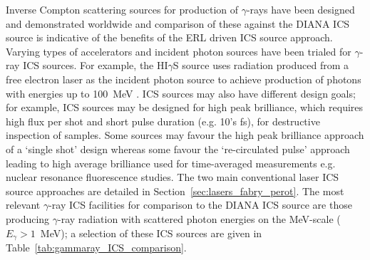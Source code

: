\documentclass[../main.tex]{subfiles}
\begin{document}
Inverse Compton scattering sources for production of $\gamma$-rays have been designed and demonstrated worldwide and comparison of these against the DIANA ICS source is indicative of the benefits of the ERL driven ICS source approach. Varying types of accelerators and incident photon sources have been trialed for $\gamma$-ray ICS sources. For example, the HI$\gamma$S source uses radiation produced from a free electron laser as the incident photon source to achieve production of photons with energies up to 100~\si{\mega\electronvolt} \cite{weller2009research}. ICS sources may also have different design goals; for example, ICS sources may be designed for high peak brilliance, which requires high flux per shot and short pulse duration (e.g. 10's \si{\femto\second}), for destructive inspection of samples. Some sources may favour the high peak brilliance approach of a `single shot' design whereas some favour the `re-circulated pulse' approach leading to high average brilliance used for time-averaged measurements e.g. nuclear resonance fluorescence studies. The two main conventional laser ICS source approaches are detailed in Section~\ref{sec:lasers_fabry_perot}. The most relevant $\gamma$-ray ICS facilities for comparison to the DIANA ICS source are those producing $\gamma$-ray radiation with scattered photon energies on the \si{\mega\electronvolt}-scale ($E_{\gamma}>1$~\si{\mega\electronvolt}); a selection of these ICS sources are given in Table~\ref{tab:gammaray_ICS_comparison}. 
\end{document}
